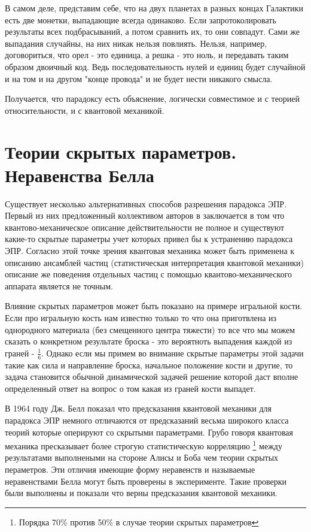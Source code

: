 В самом деле, представим себе, что на двух планетах в разных концах Галактики есть две монетки, выпадающие всегда одинаково. Если запротоколировать результаты всех подбрасываний, а потом сравнить их, то они совпадут. Сами же выпадания случайны, на них никак нельзя повлиять. Нельзя, например, договориться, что орел - это единица, а решка - это ноль, и передавать таким образом двоичный код. Ведь последовательность нулей и единиц будет случайной и на том и на другом "конце провода" и не будет нести никакого смысла.

Получается, что парадоксу есть объяснение, логически совместимое и с теорией относительности, и с квантовой механикой.

\section{Теории скрытых параметров. Неравенства Белла}
Существует несколько альтернативных способов разрешения парадокса ЭПР. Первый из них предложенный коллективом авторов в 
\cite{bEPR} заключается в том что квантово-механическое описание действительности не полное и существуют 
какие-то скрытые параметры учет которых привел бы к устранению парадокса ЭПР. Согласно этой точке зрения 
квантовая механика может быть применена к описанию ансамблей частиц (статистическая интерпретация квантовой механики)
описание же поведения отдельных частиц с помощью квантово-механического аппарата является не точным. 

Влияние скрытых параметров может быть показано на примере игральной кости. Если про игральную кость нам известно только 
то что она приготвлена из однородного материала (без смещенного центра тяжести) то все что мы можем сказать о конкретном 
результате броска - это вероятноть выпадения каждой из граней - $\frac{1}{6}$. Однако если мы примем во внимание 
скрытые параметры этой задачи такие как сила и направление броска, начальное положение кости и другие, то задача становится
обычной динамической задачей решение которой даст вполне определенный ответ на вопрос о том какая из граней кости выпадет.

В 1964 году Дж. Белл показал \cite{bBell} что предсказания квантовой механики для парадокса ЭПР немного отличаются от 
предсказаний весьма широкого класса теорий которые оперируют со скрытыми параметрами. Грубо говоря квантовая механика 
пресказывает более строгую статистическую корреляцию \footnote{Порядка 70\% против 50\% в случае теории скрытых параметров}
между результатами выполнеными на стороне Алисы и Боба чем 
теории скрытых пераметров. Эти отличия имеющие форму неравенств и называемые неравенствами Белла могут быть проверены 
в эксперименте. Такие проверки были выполнены \cite{bBellTest} и показали что верны предсказания квантовой механики. 

